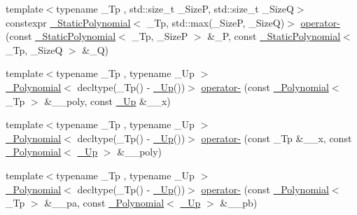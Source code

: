 \begin{DoxyCompactItemize}
\item 
{\footnotesize template$<$typename \+\_\+\+Tp , std\+::size\+\_\+t \+\_\+\+SizeP, std\+::size\+\_\+t \+\_\+\+SizeQ$>$ }\\constexpr \hyperlink{class____gnu__cxx_1_1__StaticPolynomial}{\+\_\+\+Static\+Polynomial}$<$ \+\_\+\+Tp, std\+::max(\+\_\+\+SizeP, \+\_\+\+SizeQ)$>$ \hyperlink{namespace____gnu__cxx_a7a0dd6f28607ef9be1e5eb053716076f}{operator-\/} (const \hyperlink{class____gnu__cxx_1_1__StaticPolynomial}{\+\_\+\+Static\+Polynomial}$<$ \+\_\+\+Tp, \+\_\+\+SizeP $>$ \&\+\_\+P, const \hyperlink{class____gnu__cxx_1_1__StaticPolynomial}{\+\_\+\+Static\+Polynomial}$<$ \+\_\+\+Tp, \+\_\+\+SizeQ $>$ \&\+\_\+Q)
\item 
{\footnotesize template$<$typename \+\_\+\+Tp , typename \+\_\+\+Up $>$ }\\\hyperlink{class____gnu__cxx_1_1__Polynomial}{\+\_\+\+Polynomial}$<$ decltype(\+\_\+\+Tp() -\/ \hyperlink{namespace____gnu__cxx_ab693ea357b6429b331e0bf09f9442385}{\+\_\+\+Up}())$>$ \hyperlink{namespace____gnu__cxx_abc583ac0684f0aff079c6014f3d84c1d}{operator-\/} (const \hyperlink{class____gnu__cxx_1_1__Polynomial}{\+\_\+\+Polynomial}$<$ \+\_\+\+Tp $>$ \&\+\_\+\+\_\+poly, const \hyperlink{namespace____gnu__cxx_ab693ea357b6429b331e0bf09f9442385}{\+\_\+\+Up} \&\+\_\+\+\_\+x)
\item 
{\footnotesize template$<$typename \+\_\+\+Tp , typename \+\_\+\+Up $>$ }\\\hyperlink{class____gnu__cxx_1_1__Polynomial}{\+\_\+\+Polynomial}$<$ decltype(\+\_\+\+Tp() -\/ \hyperlink{namespace____gnu__cxx_ab693ea357b6429b331e0bf09f9442385}{\+\_\+\+Up}())$>$ \hyperlink{namespace____gnu__cxx_acc72fd3c1efcf09698d30d42c4a1eb1b}{operator-\/} (const \+\_\+\+Tp \&\+\_\+\+\_\+x, const \hyperlink{class____gnu__cxx_1_1__Polynomial}{\+\_\+\+Polynomial}$<$ \hyperlink{namespace____gnu__cxx_ab693ea357b6429b331e0bf09f9442385}{\+\_\+\+Up} $>$ \&\+\_\+\+\_\+poly)
\item 
{\footnotesize template$<$typename \+\_\+\+Tp , typename \+\_\+\+Up $>$ }\\\hyperlink{class____gnu__cxx_1_1__Polynomial}{\+\_\+\+Polynomial}$<$ decltype(\+\_\+\+Tp() -\/ \hyperlink{namespace____gnu__cxx_ab693ea357b6429b331e0bf09f9442385}{\+\_\+\+Up}())$>$ \hyperlink{namespace____gnu__cxx_a4609eee7a71e3be3a103df9556fab9b4}{operator-\/} (const \hyperlink{class____gnu__cxx_1_1__Polynomial}{\+\_\+\+Polynomial}$<$ \+\_\+\+Tp $>$ \&\+\_\+\+\_\+pa, const \hyperlink{class____gnu__cxx_1_1__Polynomial}{\+\_\+\+Polynomial}$<$ \hyperlink{namespace____gnu__cxx_ab693ea357b6429b331e0bf09f9442385}{\+\_\+\+Up} $>$ \&\+\_\+\+\_\+pb)

\end{DoxyCompactItemize}
